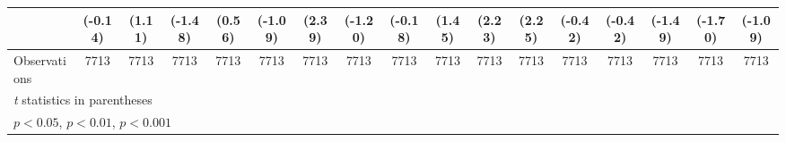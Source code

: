 \begin{table}[htbp]
\begin{tabular}{l*{16}{c}}
                    &     (-0.14)         &      (1.11)         &     (-1.48)         &      (0.56)         &     (-1.09)         &      (2.39)         &     (-1.20)         &     (-0.18)         &      (1.45)         &      (2.23)         &      (2.25)         &     (-0.42)         &     (-0.42)         &     (-1.49)         &     (-1.70)         &     (-1.09)         \\
\midrule
Observations        &        7713         &        7713         &        7713         &        7713         &        7713         &        7713         &        7713         &        7713         &        7713         &        7713         &        7713         &        7713         &        7713         &        7713         &        7713         &        7713         \\
\bottomrule
\multicolumn{17}{l}{\footnotesize \textit{t} statistics in parentheses}\\
\multicolumn{17}{l}{\footnotesize \sym{*} \(p<0.05\), \sym{**} \(p<0.01\), \sym{***} \(p<0.001\)}\\
\end{tabular}
\end{table}
